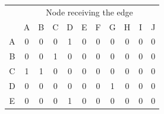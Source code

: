 \begin{table}[h!]
    \begin{tabular}{|c|cccccccccc|} 
    \hhline{~----------|}
    \multicolumn{1}{c|}{}           & \multicolumn{10}{c|}{{\cellcolor[rgb]{1,0.988,0.62}}Node receiving the edge}                                                                                                                                                                                                                                         \\ 
    \hhline{~----------|}
    \multicolumn{1}{c|}{}           & {\cellcolor[rgb]{1,1,0.78}}A & {\cellcolor[rgb]{1,1,0.78}}B & {\cellcolor[rgb]{1,1,0.78}}C & {\cellcolor[rgb]{1,1,0.78}}D & {\cellcolor[rgb]{1,1,0.78}}E & {\cellcolor[rgb]{1,1,0.78}}F & {\cellcolor[rgb]{1,1,0.78}}G & {\cellcolor[rgb]{1,1,0.78}}H & {\cellcolor[rgb]{1,1,0.78}}I & {\cellcolor[rgb]{1,1,0.78}}J  \\ 
    \hline
    {\cellcolor[rgb]{0.604,1,0.6}}A & 0                            & 0                            & 0                            & 1                            & 0                            & 0                            & 0                            & 0                            & 0                            & 0                             \\
    {\cellcolor[rgb]{0.604,1,0.6}}B & 0                            & 0                            & 1                            & 0                            & 0                            & 0                            & 0                            & 0                            & 0                            & 0                             \\
    {\cellcolor[rgb]{0.604,1,0.6}}C & 1                            & 1                            & 0                            & 0                            & 0                            & 0                            & 0                            & 0                            & 0                            & 0                             \\
    {\cellcolor[rgb]{0.604,1,0.6}}D & 0                            & 0                            & 0                            & 0                            & 0                            & 0                            & 1                            & 0                            & 0                            & 0                             \\
    {\cellcolor[rgb]{0.604,1,0.6}}E & 0                            & 0                            & 0                            & 1                            & 0                            & 0                            & 0                            & 0                            & 0                            & 0                             \\

\end{tabular}
\end{table}
